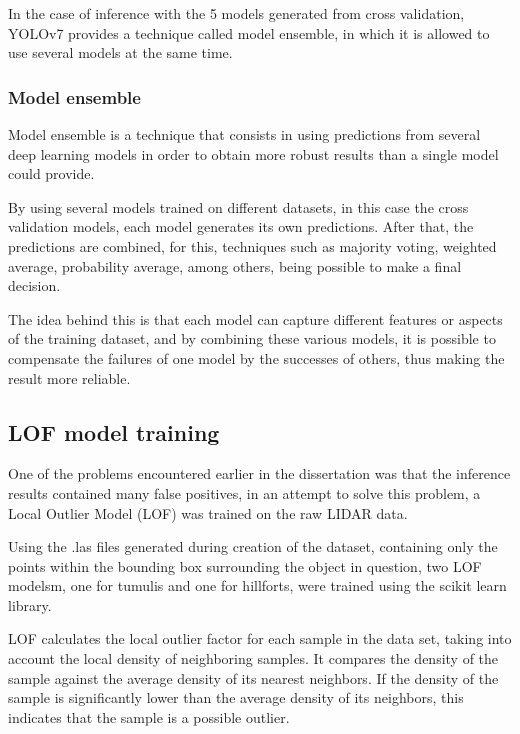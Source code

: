 In the case of inference with the 5 models generated from cross validation, YOLOv7 provides a technique called model ensemble, in which it is allowed to use several models at the same time.

\subsubsection{Model ensemble}
Model ensemble is a technique that consists in using predictions from several deep learning models in order to obtain more robust results than a single model could provide.

By using several models trained on different datasets, in this case the cross validation models, each model generates its own predictions. After that, the predictions are combined, for this, techniques such as majority voting, weighted average, probability average, among others, being possible to make a final decision.

The idea behind this is that each model can capture different features or aspects of the training dataset, and by combining these various models, it is possible to compensate the failures of one model by the successes of others, thus making the result more reliable.

\subsection{LOF model training}
One of the problems encountered earlier in the dissertation was that the inference results contained many false positives, in an attempt to solve this problem, a Local Outlier Model (LOF) was trained on the raw LIDAR data.

Using the .las files generated during creation of the dataset, containing only the points within the bounding box surrounding the object in question, two LOF modelsm, one for tumulis and one for hillforts, were trained using the scikit learn library\cite{lof}.

LOF calculates the local outlier factor for each sample in the data set, taking into account the local density of neighboring samples. It compares the density of the sample against the average density of its nearest neighbors. If the density of the sample is significantly lower than the average density of its neighbors, this indicates that the sample is a possible outlier.


